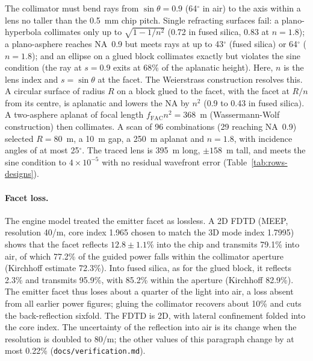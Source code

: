 The collimator must bend rays from $\sin\theta=0.9$ (64$^\circ$ in air) to the axis within a lens no taller
than the 0.5~mm chip pitch. Single refracting surfaces fail: a plano-hyperbola collimates only up to
$\sqrt{1-1/n^2}$ (0.72 in fused silica, 0.83 at $n=1.8$); a plano-asphere reaches NA~0.9 but meets rays at up to
43$^\circ$ (fused silica) or 64$^\circ$ ($n=1.8$); and an ellipse on a glued block collimates exactly but
violates the sine condition (the ray at $s=0.9$ exits at 68\% of the aplanatic height). Here, $n$ is the lens
index and $s=\sin\theta$ at the facet. The Weierstrass construction resolves this. A circular surface of radius
$R$ on a block glued to the facet, with the facet at $R/n$ from its centre, is aplanatic and lowers the NA by
$n^2$ (0.9 to 0.43 in fused silica). A two-asphere aplanat of focal length $f_\mathrm{FAC}n^2=368$~\textmu m
(Wassermann-Wolf construction) then collimates. A scan of 96 combinations (29 reaching NA~0.9) selected
$R=80$~\textmu m, a 10~\textmu m gap, a 250~\textmu m aplanat and $n=1.8$, with incidence angles of at most
25$^\circ$. The traced lens is 395~\textmu m long, $\pm158$~\textmu m tall, and meets the sine condition to
$4\times10^{-5}$ with no residual wavefront error (Table~\ref{tab:rows-designs}).

\paragraph{Facet loss.} The engine model treated the emitter facet as lossless. A 2D FDTD (MEEP, resolution
40/\textmu m, core index 1.965 chosen to match the 3D mode index 1.7995) shows that the facet reflects $12.8\pm1.1$\%
into the chip and transmits 79.1\% into air, of which 77.2\% of the guided power falls within the collimator
aperture (Kirchhoff estimate 72.3\%). Into fused silica, as for the glued block, it reflects 2.3\% and transmits
95.9\%, with 85.2\% within the aperture (Kirchhoff 82.9\%). The emitter facet thus loses about a quarter of the
light into air, a loss absent from all earlier power figures; gluing the collimator recovers about 10\% and cuts
the back-reflection sixfold. The FDTD is 2D, with lateral confinement folded into the core index. The uncertainty of the reflection into air is its change when the resolution is doubled to 80/\textmu m; the other values of this paragraph change by at most 0.22\% (\texttt{docs/\allowbreak verification.md}).

